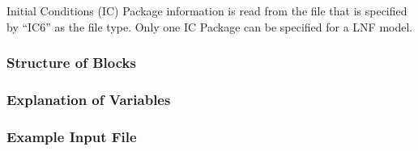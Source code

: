 Initial Conditions (IC) Package information is read from the file that is specified by ``IC6'' as the file type.  Only one IC Package can be specified for a LNF model.

\vspace{5mm}
\subsubsection{Structure of Blocks}
%


\vspace{5mm}
\subsubsection{Explanation of Variables}
\begin{description}

\end{description}

\vspace{5mm}
\subsubsection{Example Input File}


